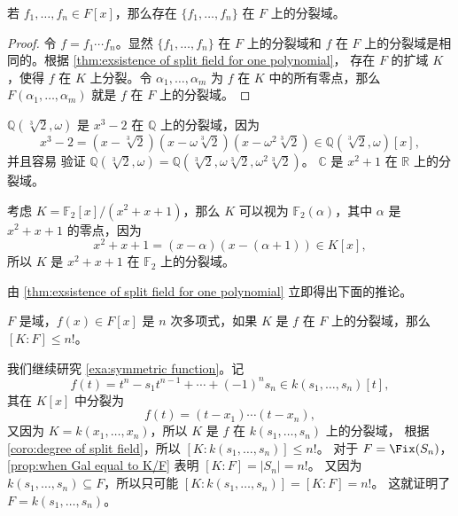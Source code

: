 \begin{corollary}
  若 $f_1,\dots,f_n\in F[x]$，那么存在 $\{f_1,\dots,f_n\}$ 在 $F$ 上的分裂域。
\end{corollary}
\begin{proof}
  令 $f=f_1\cdots f_n$。显然 $\{f_1,\dots,f_n\}$ 在 $F$ 上的分裂域和 $f$
  在 $F$ 上的分裂域是相同的。根据 \autoref{thm:exsistence of split field for one polynomial}，
  存在 $F$ 的扩域 $K$，使得 $f$ 在 $K$ 上分裂。令 $\alpha_1,\dots,\alpha_m$ 为 $f$
  在 $K$ 中的所有零点，那么 $F(\alpha_1,\dots,\alpha_m)$ 就是 $f$ 在 $F$ 上的分裂域。
\end{proof}

\begin{example}
  $\mathbb{Q}(\sqrt[3]{2},\omega)$ 是 $x^3-2$ 在 $\mathbb{Q}$ 上的分裂域，因为
  \[
    x^3-2=(x-\sqrt[3]{2})(x-\omega\sqrt[3]{2})(x-\omega^2\sqrt[3]{2})\in\mathbb{Q}(\sqrt[3]{2},\omega)[x],
  \]
  并且容易
  验证 $\mathbb{Q}(\sqrt[3]{2},\omega)=\mathbb{Q}(\sqrt[3]{2},\omega\sqrt[3]{2},\omega^2\sqrt[3]{2})$。
  $\mathbb{C}$ 是 $x^2+1$ 在 $\mathbb{R}$ 上的分裂域。
\end{example}

\begin{example}
  考虑 $K=\mathbb{F}_2[x]/(x^2+x+1)$，那么 $K$ 可以视为 $\mathbb{F}_2(\alpha)$，其中
  $\alpha$ 是 $x^2+x+1$ 的零点，因为
  \[
    x^2+x+1=(x-\alpha)(x-(\alpha+1))\in K[x],  
  \]
  所以 $K$ 是 $x^2+x+1$ 在 $\mathbb{F}_2$ 上的分裂域。
\end{example}

由 \autoref{thm:exsistence of split field for one polynomial} 立即得出下面的推论。

\begin{corollary}\label{coro:degree of split field}
  $F$ 是域，$f(x)\in F[x]$ 是 $n$ 次多项式，如果 $K$ 是 $f$ 在 $F$ 上的分裂域，那么
  $[K:F]\leq n!$。
\end{corollary}


\begin{example}
  我们继续研究 \autoref{exa:symmetric function}。记
  \[
    f(t)=t^n-s_1t^{n-1}+\cdots+(-1)^n s_n\in k(s_1,\dots,s_n)[t],  
  \]
  其在 $K[x]$ 中分裂为
  \[
    f(t)=(t-x_1)\cdots(t-x_n),  
  \]
  又因为 $K=k(x_1,\dots,x_n)$，所以 $K$ 是 $f$ 在 $k(s_1,\dots,s_n)$ 上的分裂域，
  根据 \autoref{coro:degree of split field}，所以 $[K:k(s_1,\dots,s_n)]\leq n!$。
  对于 $F=\Fix(S_n)$，\autoref{prop:when Gal equal to K/F} 表明 $[K:F]=|S_n|=n!$。
  又因为 $k(s_1,\dots,s_n)\subseteq F$，所以只可能 $[K:k(s_1,\dots,s_n)]=[K:F]=n!$。
  这就证明了 $F=k(s_1,\dots,s_n)$。
\end{example}

